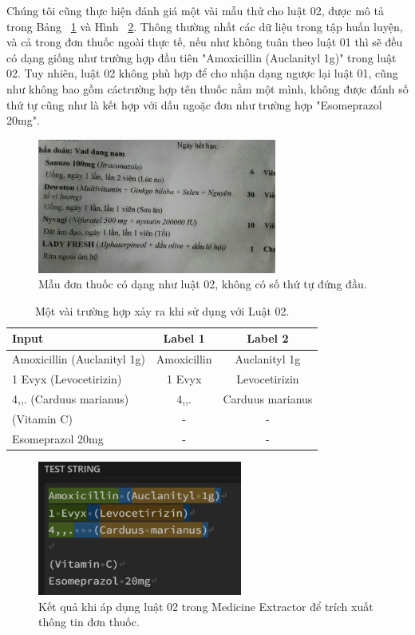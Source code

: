 \begin{itemize}
Chúng tôi cũng thực hiện đánh giá một vài mẫu thử cho luật 02, được mô tả trong Bảng ~\ref{proposed:tab_2} và Hình ~\ref{med_extr_rule_2_example}. Thông thường nhất các dữ liệu trong tập huấn luyện, và cả trong đơn thuốc ngoài thực tế, nếu như không tuân theo luật 01 thì sẽ đều có dạng giống như trường hợp đầu tiên "Amoxicillin (Auclanityl 1g)" trong luật 02. Tuy nhiên, luật 02 không phù hợp để cho nhận dạng ngược lại luật 01, cũng như không bao gồm cáctrường hợp tên thuốc nằm một mình, không được đánh số thứ tự cũng như là kết hợp với dấu ngoặc đơn như trường hợp "Esomeprazol 20mg".

\begin{figure}
\centering
\includegraphics[width=0.7\textwidth]{mep_img/med_extr_rule_2.png}
\caption{Mẫu đơn thuốc có dạng như luật 02, không có số thứ tự đứng đầu.}\label{med_extr_rule_2}
\end{figure}

\begin{table}
\centering
\caption{Một vài trường hợp xảy ra khi sử dụng với Luật 02. }\label{proposed:tab_2}
\begin{tabular}{|l|c|c|}
\hline
Input           & Label 1 & Label 2 \\ 
\hline Amoxicillin (Auclanityl 1g) & Amoxicillin & Auclanityl 1g \\ 
\hline 1 Evyx (Levocetirizin) & 1 Evyx       & Levocetirizin     \\ 
\hline 4,,.   (Carduus marianus) & 4,,. & Carduus marianus \\
\hline (Vitamin C) &    -   & - \\
\hline Esomeprazol 20mg &      -  & - \\

\hline 
\end{tabular}
\end{table}

\begin{figure}
\centering
\includegraphics[width=0.6\textwidth]{mep_img/ME_TESTCASE_RULE_02.png}
\caption{Kết quả khi áp dụng luật 02 trong Medicine Extractor để trích xuất thông tin đơn thuốc.}\label{med_extr_rule_2_example}
\end{figure}


\end{itemize}
